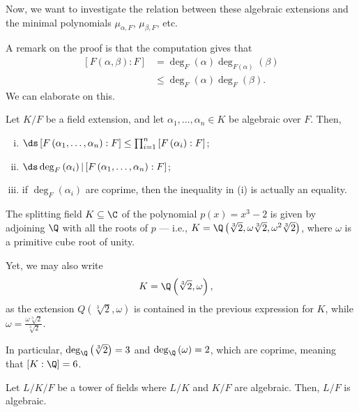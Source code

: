 \documentclass[10pt]{mypackage}
\begin{document}
Now, we want to investigate the relation between these algebraic extensions and the minimal polynomials $\mu_{\alpha,F}$, $\mu_{\beta,F}$, etc.

A remark on the proof is that the computation gives that
\begin{align*}
  \left[ F\left( \alpha,\beta \right):F \right] &= \deg_{F}(\alpha)\deg_{F(\alpha)}(\beta)\\
                                                &\leq \deg_{F}(\alpha)\deg_{F}(\beta).
\end{align*}
We can elaborate on this.
\begin{corollary}
  Let $K/F$ be a field extension, and let $\alpha_1,\dots,\alpha_n\in K$ be algebraic over $F$. Then,
  \begin{enumerate}[(i)]
    \item $\ds \left[ F\left( \alpha_1,\dots,\alpha_n \right):F \right] \leq \prod_{i=1}^{n}\left[ F\left( \alpha_i \right):F \right]$;
    \item $\ds \deg_F\left( \alpha_i \right) | \left[ F\left( \alpha_1,\dots,\alpha_n \right):F \right]$;
    \item if $\deg_F\left( \alpha_i \right)$ are coprime, then the inequality in (i) is actually an equality.
  \end{enumerate}
\end{corollary}
\begin{example}
  The splitting field $K\subseteq \C$ of the polynomial $p(x) = x^3 - 2$ is given by adjoining $\Q$ with all the roots of $p$ --- i.e., $K = \Q\left( \sqrt[3]{2},\omega\sqrt[3]{2},\omega^2\sqrt[3]{2} \right)$, where $\omega$ is a primitive cube root of unity.

  Yet, we may also write
  \begin{align*}
    K &= \Q\left( \sqrt[3]{2},\omega \right),
  \end{align*}
  as the extension $Q\left( \sqrt[3]{2},\omega \right)$ is contained in the previous expression for $K$, while $\omega = \frac{\omega\sqrt[3]{2}}{\sqrt[3]{2}}$.

  In particular, $\deg_{\Q}\left( \sqrt[3]{2} \right) = 3$ and $\deg_{\Q}\left( \omega \right) = 2$, which are coprime, meaning that $\left[ K:\Q \right] = 6$.
\end{example}
\begin{lemma}
  Let $L/K/F$ be a tower of fields where $L/K$ and $K/F$ are algebraic. Then, $L/F$ is algebraic.
\end{lemma}
\end{document}
